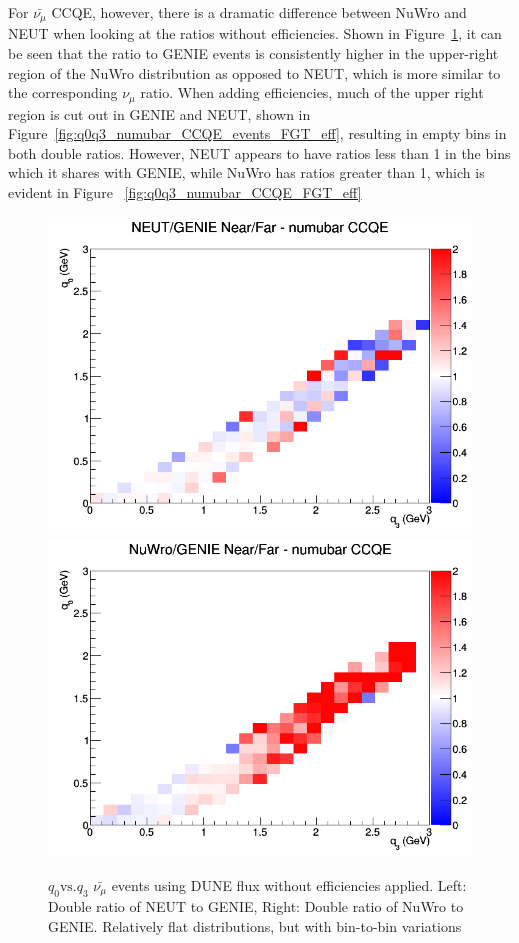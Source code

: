 \documentclass[12pt]{article}
\begin{document}
For $\bar{\nu_{\mu}}$ CCQE, however, there is a dramatic difference between NuWro and NEUT when looking at the ratios without efficiencies. Shown in Figure~\ref{fig:q0q3_numubar_CCQE_no_eff}, it can be seen that the ratio to GENIE events is consistently higher in the upper-right region of the NuWro distribution as opposed to NEUT, which is more similar to the corresponding $\nu_{\mu}$ ratio. When adding efficiencies, much of the upper right region is cut out in GENIE and NEUT, shown in Figure~\ref{fig:q0q3_numubar_CCQE_events_FGT_eff}, resulting in empty bins in both double ratios. However, NEUT appears to have ratios less than 1 in the bins which it shares with GENIE, while NuWro has ratios greater than 1, which is evident in Figure ~\ref{fig:q0q3_numubar_CCQE_FGT_eff}
\begin{figure}[h]
\centering
{}
\includegraphics[width=\linewidth]{q0_q3/nominal/ratios/CCQE_NEUT_GENIE_numubar_NF_q3_q0.png}
\endminipage
{}
\includegraphics[width=\linewidth]{q0_q3/nominal/ratios/CCQE_NuWro_GENIE_numubar_NF_q3_q0.png}
\endminipage
\caption{$q_0 \textrm{vs.} q_3$ $\bar{\nu_{\mu}}$ events using DUNE flux without efficiencies applied. Left: Double ratio of NEUT to GENIE, Right: Double ratio of NuWro to GENIE. Relatively flat distributions, but with bin-to-bin variations}
\label{fig:q0q3_numubar_CCQE_no_eff}
\end{figure}
\end{document}
